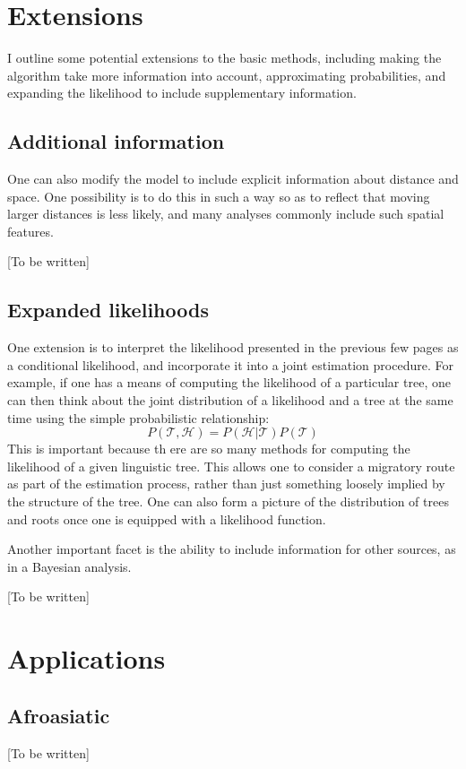 \documentclass[11pt]{article}
\begin{document}
\section{Extensions}

I outline some potential extensions to the basic methods, including making the algorithm take more information into account, approximating probabilities, and expanding the likelihood to include supplementary information.

\subsection{Additional information}

One can also modify the model to include explicit information about distance and space. One possibility is to do this in such a way so as to reflect that moving larger distances is less likely, and many analyses commonly include such spatial features.

[To be written]

\subsection{Expanded likelihoods}
One extension is to interpret the likelihood presented in the previous few pages as a conditional likelihood, and incorporate it into a joint estimation procedure. For example, if one has a means of computing the likelihood of a particular tree, one can then think about the joint distribution of a likelihood and a tree at the same time using the simple probabilistic relationship:
$$
P(\mathcal{T},\mathcal{H})=P(\mathcal{H}|\mathcal{T})P(\mathcal{T})
$$
This is important because th
ere are so many methods for computing the likelihood of a given linguistic tree. This allows one to consider a migratory route as part of the estimation process, rather than just something loosely implied by the structure of the tree. One can also form a picture of the distribution of trees and roots once one is equipped with a likelihood function. 

Another important facet is the ability to include information for other sources, as in a Bayesian analysis. 

[To be written]


\section{Applications}

\subsection{Afroasiatic}
[To be written]
\end{document}

